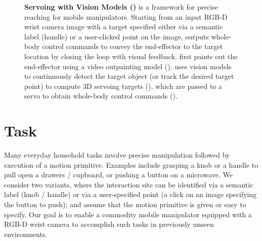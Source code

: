 \begin{figure*}
\caption{{\bf Servoing with Vision Models (\name)} is a  framework for precise reaching for mobile manipulators. Starting from an input RGB-D wrist camera image with a target specified either via a semantic label (\eg handle) or a user-clicked point on the image, \name outputs whole-body control commands to convey the end-effector to the target location by closing the loop with visual feedback. \name first paints out the end-effector using a video outpainting model (), uses vision models to continuously detect the target object (or track the desired target point) to compute 3D servoing targets (), which are passed to a servo to obtain whole-body control commands ().}
\end{figure*}

\section{Task} Many everyday household tasks involve precise manipulation
followed by execution of a motion primitive. Examples include grasping a knob
or a handle to pull open a drawers / cupboard, or pushing a button on a
microwave. We consider two variants, where the interaction site can be
identified via a semantic label (\eg knob / handle) or via a user-specified
point (\eg a click on an image specifying the button to push); and assume that
the motion primitive is given or easy to specify. 
Our goal is to enable a commodity
mobile manipulator equipped with a RGB-D wrist camera to accomplish such tasks
in previously unseen environments.




